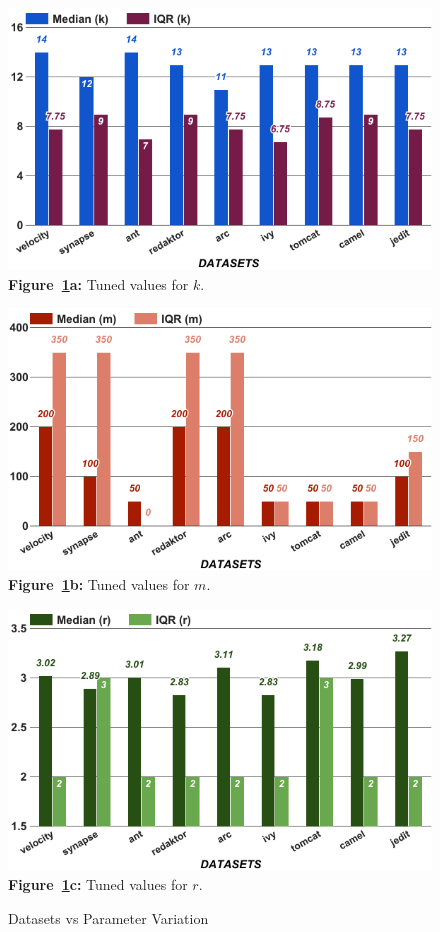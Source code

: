 \begin{figure}[!t]
    \centering
    \begin{minipage}{.33\textwidth}
    \centering
        \includegraphics[width=.95\linewidth]{./fig/k.png}
        {\bf Figure~\ref{fig:para}a:} Tuned values for $k$.
    \end{minipage}%
    \begin{minipage}{.33\textwidth}
    \centering
        \includegraphics[width=.95\linewidth]{./fig/m.png}
        {\bf Figure~\ref{fig:para}b:} Tuned values for $m$.
    \end{minipage}
    \begin{minipage}{.33\textwidth}
    \centering
        \includegraphics[width=.95\linewidth]{./fig/r.png}
        {\bf Figure~\ref{fig:para}c:} Tuned values for $r$.
    \end{minipage}
    \caption{Datasets vs Parameter Variation}
    \label{fig:para}
\vspace{-0.4cm}
\end{figure}


